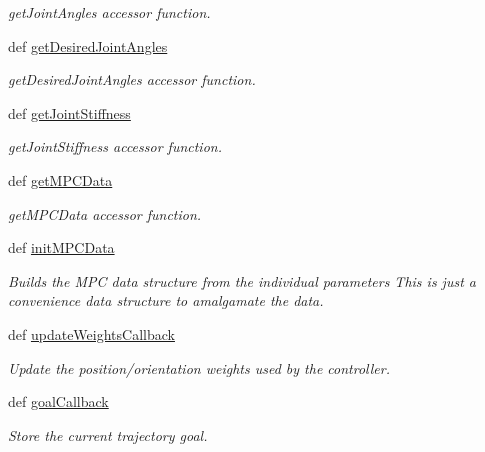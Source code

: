 \begin{DoxyCompactItemize}
\begin{DoxyCompactList}\small\item\em get\-Joint\-Angles accessor function. \end{DoxyCompactList}\item 
def \hyperlink{classhrl__haptic__mpc_1_1haptic__mpc_1_1_haptic_m_p_c_a8ef92698778bff0bbc677f20b06d1b16}{get\-Desired\-Joint\-Angles}
\begin{DoxyCompactList}\small\item\em get\-Desired\-Joint\-Angles accessor function. \end{DoxyCompactList}\item 
def \hyperlink{classhrl__haptic__mpc_1_1haptic__mpc_1_1_haptic_m_p_c_a265ec799c6d312b2d0913a81e1d56e1c}{get\-Joint\-Stiffness}
\begin{DoxyCompactList}\small\item\em get\-Joint\-Stiffness accessor function. \end{DoxyCompactList}\item 
def \hyperlink{classhrl__haptic__mpc_1_1haptic__mpc_1_1_haptic_m_p_c_ac0dc037cfe8da7a55b493ca02b3be70c}{get\-M\-P\-C\-Data}
\begin{DoxyCompactList}\small\item\em get\-M\-P\-C\-Data accessor function. \end{DoxyCompactList}\item 
def \hyperlink{classhrl__haptic__mpc_1_1haptic__mpc_1_1_haptic_m_p_c_ad8b63f8a2b0def761d54395a6c58090f}{init\-M\-P\-C\-Data}
\begin{DoxyCompactList}\small\item\em \-Builds the \-M\-P\-C data structure from the individual parameters \-This is just a convenience data structure to amalgamate the data. \end{DoxyCompactList}\item 
def \hyperlink{classhrl__haptic__mpc_1_1haptic__mpc_1_1_haptic_m_p_c_a8657d3dd1e5c8d5e4404aff389ca806a}{update\-Weights\-Callback}
\begin{DoxyCompactList}\small\item\em \-Update the position/orientation weights used by the controller. \end{DoxyCompactList}\item 
def \hyperlink{classhrl__haptic__mpc_1_1haptic__mpc_1_1_haptic_m_p_c_aab28b262d8264907587e31bf323a89d4}{goal\-Callback}
\begin{DoxyCompactList}\small\item\em \-Store the current trajectory goal. \end{DoxyCompactList}\item 

\end{DoxyCompactItemize}
